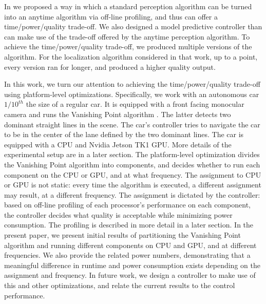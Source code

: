 In \cite{RTSS15} we proposed a way in which a standard perception algorithm can be turned into an anytime algorithm via off-line profiling, and thus can offer a time/power/quality trade-off.
We also designed a model predictive controller than can make use of the trade-off offered by the anytime perception algorithm.
To achieve the time/power/quality trade-off, we produced multiple versions of the algorithm.
For the localization algorithm considered in that work, up to a point, every version ran for longer, and produced a higher quality output. 

In this work, we turn our attention to achieving the time/power/quality trade-off using platform-level optimizations.
Specifically, we work with an autonomous car $1/10^{th}$ the size of a regular car. 
It is equipped with a front facing monocular camera and runs the Vanishing Point algorithm \cite{VP1}. 
The latter detects two dominant straight lines in the scene.  The car's controller tries to navigate the car to be in the center of the lane defined by the two dominant lines. The car is equipped with a CPU and Nvidia Jetson TK1 GPU. More details of the experimental setup are in a later section.
The platform-level optimization divides the Vanishing Point algorithm into components, and decides whether to run each component on the CPU or GPU, and at what frequency.
The assignment to CPU or GPU is not static: every time the algorithm is executed, a different assignment may result, at a different frequency.
The assignment is dictated by the controller: based on off-line profiling of each processor's performance on each component, the controller decides what quality is acceptable while minimizing power consumption. The profiling is described in more detail in a later section.
In the present paper, we present initial results of partitioning the Vanishing Point algorithm and running different components on CPU and GPU, and at different frequencies.
We also provide the related power numbers, demonstrating that a meaningful difference in runtime and power consumption exists depending on the assignment and frequency.
In future work, we design a controller to make use of this and other optimizations, and relate the current results to the control performance.
%
%
%
